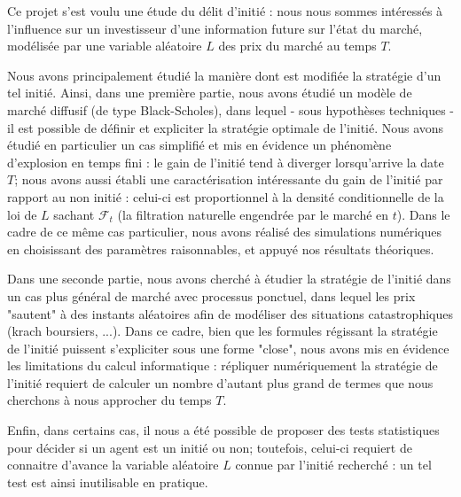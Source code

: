 \documentclass[../finalreport.tex]{subfiles}
\begin{document}
\par Ce projet s'est voulu une étude du délit d'initié : nous nous sommes intéressés à l'influence sur un investisseur d'une information future sur l'état du marché, modélisée par une variable aléatoire $L$ des prix du marché au temps $T$.\\

\par Nous avons principalement étudié la manière dont est modifiée la stratégie d'un tel initié. Ainsi, dans une première partie, nous avons étudié un modèle de marché diffusif (de type Black-Scholes), dans lequel - sous hypothèses techniques - il est possible de définir et expliciter la stratégie optimale de l'initié. Nous avons étudié en particulier un cas simplifié et mis en évidence un phénomène d'explosion en temps fini : le gain de l'initié tend à diverger lorsqu'arrive la date $T$; nous avons aussi établi une caractérisation intéressante du gain de l'initié par rapport au non initié : celui-ci est proportionnel à la densité conditionnelle de la loi de $L$ sachant $\mathcal{F}_t$ (la filtration naturelle engendrée par le marché en $t$). Dans le cadre de ce même cas particulier, nous avons réalisé des simulations numériques en choisissant des paramètres raisonnables, et appuyé nos résultats théoriques.\\

\par Dans une seconde partie, nous avons cherché à étudier la stratégie de l'initié dans un cas plus général de marché avec processus ponctuel, dans lequel les prix "sautent" à des instants aléatoires afin de modéliser des situations catastrophiques (krach boursiers, ...). Dans ce cadre, bien que les formules régissant la stratégie de l'initié puissent s'expliciter sous une forme "close", nous avons mis en évidence les limitations du calcul informatique : répliquer numériquement la stratégie de l'initié requiert de calculer un nombre d'autant plus grand de termes que nous cherchons à nous approcher du temps $T$.
\\

\par Enfin, dans certains cas, il nous a été possible de proposer des tests statistiques pour décider si un agent est un initié ou non; toutefois, celui-ci requiert de connaitre d'avance la variable aléatoire $L$ connue par l'initié recherché : un tel test est ainsi inutilisable en pratique.
\end{document}
